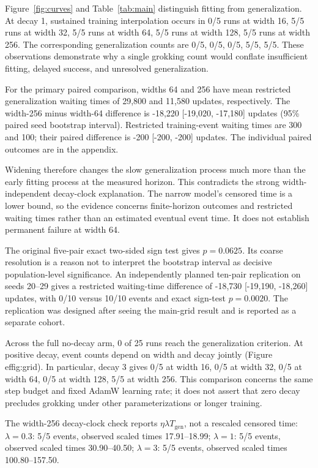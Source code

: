 Figure~\ref{fig:curves} and Table~\ref{tab:main} distinguish fitting from generalization. At decay 1, sustained training interpolation occurs in 0/5 runs at width 16, 5/5 runs at width 32, 5/5 runs at width 64, 5/5 runs at width 128, 5/5 runs at width 256. The corresponding generalization counts are 0/5, 0/5, 0/5, 5/5, 5/5. These observations demonstrate why a single grokking count would conflate insufficient fitting, delayed success, and unresolved generalization.

For the primary paired comparison, widths 64 and 256 have mean restricted generalization waiting times of 29,800 and 11,580 updates, respectively. The width-256 minus width-64 difference is -18,220 [-19,020, -17,180] updates (95\% paired seed bootstrap interval). Restricted training-event waiting times are 300 and 100; their paired difference is -200 [-200, -200] updates. The individual paired outcomes are in the appendix.

Widening therefore changes the slow generalization process much more than the early fitting process at the measured horizon. This contradicts the strong width-independent decay-clock explanation. The narrow model's censored time is a lower bound, so the evidence concerns finite-horizon outcomes and restricted waiting times rather than an estimated eventual event time. It does not establish permanent failure at width 64.

The original five-pair exact two-sided sign test gives $p=0.0625$. Its coarse resolution is a reason not to interpret the bootstrap interval as decisive population-level significance. An independently planned ten-pair replication on seeds 20--29 gives a restricted waiting-time difference of -18,730 [-19,190, -18,260] updates, with 0/10 versus 10/10 events and exact sign-test $p=0.0020$. The replication was designed after seeing the main-grid result and is reported as a separate cohort.

Across the full no-decay arm, 0 of 25 runs reach the generalization criterion. At positive decay, event counts depend on width and decay jointly (Figure~
ef{fig:grid}). In particular, decay 3 gives 0/5 at width 16, 0/5 at width 32, 0/5 at width 64, 0/5 at width 128, 5/5 at width 256. This comparison concerns the same step budget and fixed AdamW learning rate; it does not assert that zero decay precludes grokking under other parameterizations or longer training.

The width-256 decay-clock check reports $\eta\lambda T_{\mathrm{gen}}$, not a rescaled censored time: $\lambda=0.3$: 5/5 events, observed scaled times 17.91--18.99; $\lambda=1$: 5/5 events, observed scaled times 30.90--40.50; $\lambda=3$: 5/5 events, observed scaled times 100.80--157.50.

